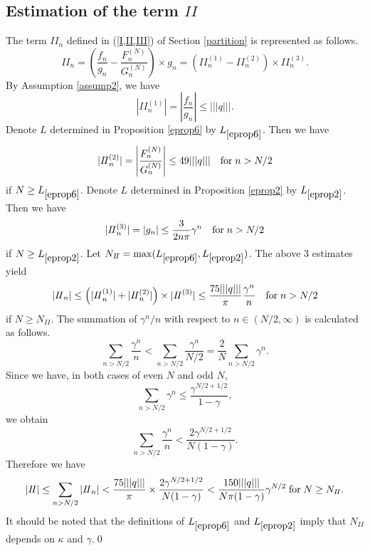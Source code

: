 \subsection{Estimation of the term $I\!I$}
\label{ii}
The term ${I\!I}_n$ defined in (\ref{I,II,III}) of Section \ref{partition}
is represented as follows.
\begin{displaymath}
{I\!I}_n =\left(\frac{f_n}{g_n}-\frac{F^{(N)}_n}{G^{(N)}_n}\right)\times g_n=\left({I\!I}^{(1)}_n-{I\!I}^{(2)}_n\right)\times {I\!I}^{(3)}_n.
\end{displaymath}
By Assumption \ref{assump2}, we have
\begin{displaymath}
|{I\!I}^{(1)}_n| = \left|\frac{f_n}{g_n}\right| \le |||q|||.
\end{displaymath}
Denote $L$ determined in Proposition \ref{eprop6} by $L_{\ref{eprop6}}$. Then we have
\begin{displaymath}
|{I\!I}^{(2)}_n| = \left|\frac{F^{(N)}_n}{G^{(N)}_n}\right| \le 49|||q||| \quad {\rm for}\;n > N/2
\end{displaymath}
if $N\ge L_{\ref{eprop6}}$.
Denote $L$ determined in Proposition \ref{eprop2} by $L_{\ref{eprop2}}$. Then we have
\begin{displaymath}
|{I\!I}^{(3)}_n| =|g_n| \le \frac{3}{2 n \pi}\gamma^n \quad {\rm for}\; n > N/2
\end{displaymath}
if $N\ge L_{\ref{eprop2}}$.
Let $N_{I\!I}=\max(L_{\ref{eprop6}}, L_{\ref{eprop2}})$. The above 3 estimates yield
\begin{displaymath}
|{I\!I}_n| \le \left({|I\!I}^{(1)}_n|+|{I\!I}^{(2)}_n|\right) \times |{I\!I}^{(3)}| \le \frac{75|||q|||}{\pi}\frac{\gamma^n}{n} \quad {\rm for}\; n > N/2
\end{displaymath}
if $N\ge N_{I\!I}$.
The summation of $\gamma^n/n$ with respect to $n\in(N/2,\infty)$ is calculated as follows.
\begin{displaymath}
\sum_{n>N/2}\frac{\gamma^n}{n} < \sum_{n>N/2}\frac{\gamma^n}{N/2}=\frac{2}{N}\sum_{n>N/2}\gamma^n.
\end{displaymath}
Since we have, in both cases of even $N$ and odd $N$,
\begin{displaymath}
\sum_{n > N/2} \gamma^{n} \le \frac{\gamma^{N/2+1/2}}{1-\gamma},
\end{displaymath}
we obtain 
\begin{displaymath}
\sum_{n>N/2}\frac{\gamma^n}{n} < \frac{2\gamma^{N/2+1/2}}{N(1-\gamma)}.
\end{displaymath}
Therefore we have
\begin{eqnarray*}
|I\!I| \le \sum_{n>N/2}|{I\!I}_n| < \frac{75|||q|||}{\pi} \times \frac{2\gamma^{N/2+1/2}}{N(1-\gamma)} < \frac{150|||q|||}{N\pi(1-\gamma)}\gamma^{N/2} \;
 {\rm for}\; N \ge N_{I\!I}.
\end{eqnarray*}
It should be noted that the definitions of $L_{\ref{eprop6}}$ and $L_{\ref{eprop2}}$ imply that $N_{I\!I}$ depends on $\kappa$ and $\gamma$.\qed

